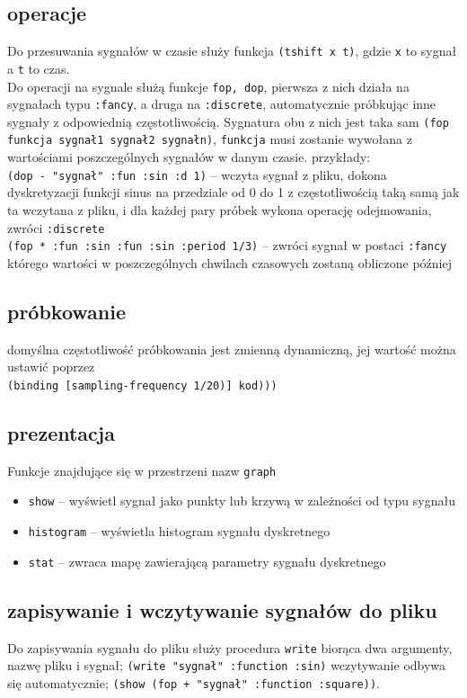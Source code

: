 \documentclass[12pt]{article}
\newcommand{\cljt}[1]{\texttt{#1}}
\begin{document}
\subsection{operacje}
Do przesuwania sygnałów w czasie służy funkcja \cljt{(tshift x t)}, gdzie \cljt{x} to sygnał a \cljt{t} to czas. \\
Do operacji na sygnale służą funkcje \cljt{fop, dop}, pierwsza z nich działa na sygnałach typu \cljt{:fancy}, a druga na \cljt{:discrete}, automatycznie próbkując inne sygnały z odpowiednią częstotliwością. Sygnatura obu z nich jest taka sam \cljt{(fop funkcja sygnał1 sygnał2 sygnałn)}, \cljt{funkcja} musi zostanie wywołana z wartościami poszczególnych sygnałów w danym czasie. przykłady: \\
\cljt{(dop - "sygnał" {:fun :sin :d 1})} -- wczyta sygnał z pliku, dokona dyskretyzacji funkcji sinus na przedziale od 0 do 1 z częstotliwością taką samą jak ta wczytana z pliku, i dla każdej pary próbek wykona operację odejmowania, zwróci \cljt{:discrete} \\
\cljt{(fop * {:fun :sin} {:fun :sin :period 1/3})} -- zwróci sygnał w postaci \cljt{:fancy} którego wartości w poszczególnych chwilach czasowych zostaną obliczone później
\subsection{próbkowanie}
domyślna częstotliwość próbkowania jest zmienną dynamiczną, jej wartość można ustawić poprzez \\
\cljt{(binding [sampling-frequency 1/20)] kod)))}

\subsection{prezentacja}
Funkcje znajdujące się w przestrzeni nazw \cljt{graph}
\begin{itemize}
	\item \cljt{show} -- wyświetl sygnał jako punkty lub krzywą w zależności od typu sygnału
	\item \cljt{histogram} -- wyświetla histogram sygnału dyskretnego
	\item \cljt{stat} -- zwraca mapę zawierającą parametry sygnału dyskretnego
\end{itemize}

\subsection{zapisywanie i wczytywanie sygnałów do pliku}
Do zapisywania sygnału do pliku służy procedura \cljt{write} biorąca dwa argumenty, nazwę pliku i sygnał;
\cljt{(write "sygnał" {:function :sin})}
wczytywanie odbywa się automatycznie;
\cljt{(show (fop + "sygnał" {:function :square}))}.
\end{document}
